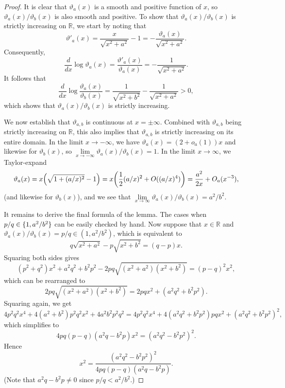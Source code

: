 \documentclass[11pt]{amsart}
\theoremstyle{definition}
\DeclarePairedDelimiter{\paren}{(}{)}
\DeclarePairedDelimiter{\set}{\{}{\}}
\newcommand{\RR}{\mathbb{R}}
\begin{document}
\begin{proof}
It is clear that $\vartheta_a(x)$ is a smooth and positive function of $x$, so $\vartheta_a(x)/\vartheta_b(x)$ is also smooth and positive. To show that $\vartheta_a(x)/\vartheta_b(x)$ is strictly increasing on $\RR$, we start by noting that
\[\vartheta'_a(x) = \frac{x}{\sqrt{x^2 + a^2}} - 1 = -\frac{\vartheta_a(x)}{\sqrt{x^2+a^2}}.\]
Consequently,
\[\frac{d}{dx} \log \vartheta_a(x) = \frac{\vartheta'_a(x)}{\vartheta_a(x)} = -\frac{1}{\sqrt{x^2+a^2}}.\]
It follows that
\[\frac{d}{dx} \log \frac{\vartheta_a(x)}{\vartheta_b(x)} = \frac{1}{\sqrt{x^2+b^2}} - \frac{1}{\sqrt{x^2+a^2}} > 0,\]
which shows that $\vartheta_a(x)/\vartheta_b(x)$ is strictly increasing.

We now establish that $\vartheta_{a,b}$ is continuous at $x=\pm \infty$.  Combined with $\vartheta_{a,b}$ being strictly increasing on $\RR$, this also implies that $\vartheta_{a,b}$ is strictly increasing on its entire domain. In the limit $x \to -\infty$, we have $\vartheta_a(x)=(2+o_a(1))x$ and likewise for $\vartheta_b(x)$, so $\lim\limits_{x \to -\infty} \vartheta_a(x)/\vartheta_b(x) = 1$. In the limit $x \to \infty$, we Taylor-expand \[\vartheta_a(x)=x\paren*{\sqrt{1+(a/x)^2}-1}=x\paren*{\frac{1}{2} (a/x)^2+O((a/x)^4)} = \frac{a^2}{2x} + O_a(x^{-3}),\]
(and likewise for $\vartheta_b(x)$), and we see that $\lim\limits_{x \to \infty} \vartheta_a(x)/\vartheta_b(x) = a^2/b^2$.

It remains to derive the final formula of the lemma. The cases when $p/q \in \set{1,a^2/b^2}$ can be easily checked by hand. Now suppose that $x \in \RR$ and $\vartheta_a(x)/\vartheta_b(x)= p/q \in (1, a^2/b^2)$, which is equivalent to
\[q\sqrt{x^2 + a^2} - p\sqrt{x^2 + b^2} = (q-p)x.\]  Squaring both sides gives
\[(p^2+q^2)x^2 + a^2q^2 + b^2p^2 - 2pq\sqrt{(x^2+a^2)(x^2+b^2)} = (p-q)^2 x^2,\]
which can be rearranged to
\[2pq\sqrt{(x^2+a^2)(x^2+b^2)} = 2pqx^2 + (a^2q^2 + b^2p^2).
\]
Squaring again, we get
\[4p^2q^2 x^4 + 4(a^2 + b^2)p^2q^2x^2 + 4a^2b^2p^2q^2 = 4p^2q^2x^4 + 4(a^2q^2+b^2p^2)pqx^2 + (a^2q^2 + b^2p^2)^2,\]
which simplifies to
\[4pq(p-q)(a^2q-b^2p) x^2 = (a^2q^2-b^2p^2)^2.\]
Hence
\[x^2 = \frac{(a^2q^2-b^2p^2)^2}{4pq(p-q)(a^2q-b^2p)}.\]
(Note that $a^2q- b^2p\neq 0$ since $p/q < a^2/b^2$.)
\end{proof}
\end{document}
